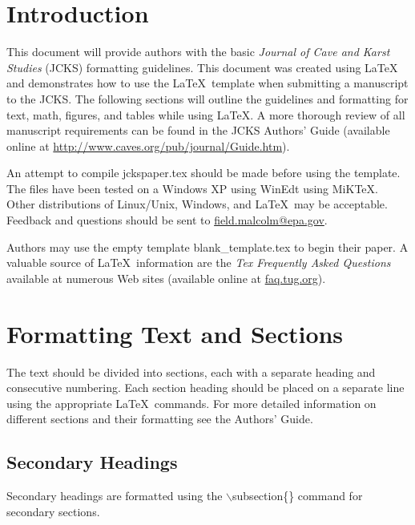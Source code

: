 \documentclass[12pt]{article}
\begin{document}
{}
{\linenumbers}

%
\section{Introduction}
This document will provide authors with the basic \textit{Journal of Cave and Karst Studies} (JCKS) formatting guidelines.  This document was created using \LaTeX\, and demonstrates how to use the \LaTeX\ template when submitting a manuscript to the JCKS.  The following sections will outline the guidelines and formatting for text, math, figures, and tables while using \LaTeX\/.  A more thorough review of all manuscript requirements can be found in the JCKS Authors' Guide (available online at \url{http://www.caves.org/pub/journal/Guide.htm}).

An attempt to compile jckspaper.tex should be made before using the template.  The files have been tested on a Windows XP using WinEdt using MiKTeX.  Other distributions of Linux/Unix, Windows, and \LaTeX\ may be acceptable.  Feedback and questions should be sent to \url{field.malcolm@epa.gov}.

Authors may use the empty template blank\_template.tex to begin their paper.  A valuable source of \LaTeX\ information are the \textit{Tex Frequently Asked Questions} available at numerous Web sites (available online at \url{faq.tug.org}).

\section{Formatting Text and Sections}
The text should be divided into sections, each with a separate heading and consecutive numbering.  Each section heading should be placed on a separate line using the appropriate \LaTeX\ commands.  For more detailed information on different sections and their formatting see the Authors' Guide.

\subsection{Secondary Headings}
Secondary headings are formatted using the $\backslash$subsection\{\} command for secondary sections.
\end{document}
